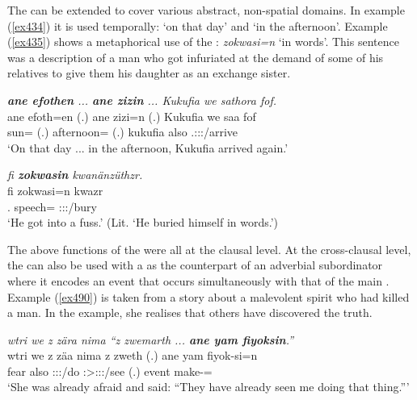 The   can be extended to cover various abstract, non-spatial domains. In example (\ref{ex434}) it is used temporally: `on that day' and `in the afternoon'. Example (\ref{ex435}) shows a metaphorical use of the  : \emph{zokwasi=n} `in words'. This sentence was a description of a man who got infuriated at the demand of some of his relatives to give them his daughter as an exchange sister.

\begin{exe}
	\ex \emph{\textbf{ane efothen} ... \textbf{ane zizin} ... Kukufia we sathora fof.}\\
	\gll ane efoth=en (.) ane zizi=n (.) Kukufia we saa fof\\
	\Dem{} sun=\Loc{} (.) \Dem{} afternoon=\Loc{} (.) kukufia also \Tsg.\Masc:\Sbj:\Pst:\Pfv/arrive \Emph\\
	\trans `On that day ... in the afternoon, Kukufia arrived again.'
	\label{ex434}
\end{exe}
\begin{exe}
	\ex \emph{fi \textbf{zokwasin} kwanänzüthzr.}\\
	\gll fi zokwasi=n kwazr\\
	\Third.\Abs{} speech=\Loc{} \Stsg:\Sbj:\Rpst:\Ipfv/bury\\
	\trans `He got into a fuss.' (Lit. `He buried himself in words.')
	\label{ex435}
\end{exe}

The above functions of the  were all at the clausal level. At the cross-clausal level, the  can also be used with a  as the counterpart of an adverbial subordinator where it encodes an event that occurs simultaneously with that of the main . Example (\ref{ex490}) is taken from a story about a malevolent spirit who had killed a man. In the example, she realises that others have discovered the truth.

\begin{exe}
	\ex \emph{wtri we z zära nima ``z zwemarth ... \textbf{ane yam fiyoksin}.''}\\
	\gll wtri we z zäa nima z zweth (.) ane yam fiyok-si=n\\
	fear also \Iam{} \Stsg:\Sbj:\Pst:\Pfv/do \Quot{} \Iam{} \Stpl:\Sbj>\Fsg:\Obj:\Rpst:\Pfv/see (.) \Dem{} event make-\Nmlz=\Loc{}\\
	\trans `She was already afraid and said: ``They have already seen me doing that thing.'''
	\label{ex490}
\end{exe}

